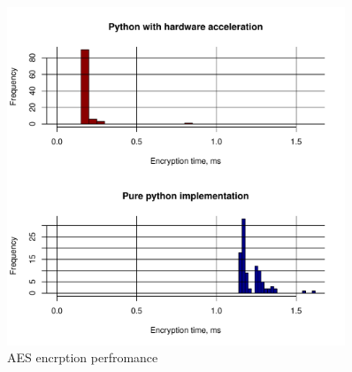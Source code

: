 \begin{figure}[h!]
\centering
\includegraphics[width=0.9\textwidth]{graphics/AES.pdf}
\caption{AES encrption perfromance}
\label{fig:testbed}
\end{figure}
